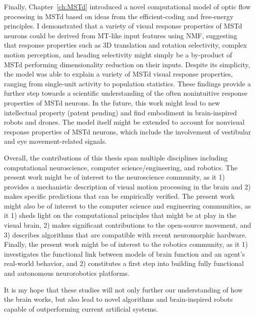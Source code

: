 Finally, Chapter~\ref{ch:MSTd} introduced a novel computational model
of optic flow processing in \ac{MSTd} based on ideas from the 
efficient-coding and free-energy principles. 
I demonstrated that a variety of visual response properties of \ac{MSTd}
neurons could be derived from \ac{MT}-like input features using \ac{NMF},
suggesting that response properties such as 3D translation and rotation
selectivity, complex motion perception, and heading selectivity might 
simply be a by-product of \ac{MSTd} performing dimensionality reduction 
on their inputs.
Despite its simplicity, the model was able to explain a variety of
\ac{MSTd} visual response properties, ranging from single-unit activity to
population statistics.
These findings provide a further step towards a scientific understanding
of the often nonintuitive response properties of \ac{MSTd} neurons.
In the future, this work might lead to new intellectual property (patent pending)
and find embodiment in brain-inspired robots and drones.
The model itself might be extended to account for nonvisual response
properties of \ac{MSTd} neurons, which include the involvement of
vestibular and eye movement-related signals.

Overall, the contributions of this thesis span multiple disciplines including
computational neuroscience, computer science/engineering, and robotics.
The present work might be of interest to the neuroscience community, as it
1) provides a mechanistic description of visual motion processing in the brain
and 2) makes specific predictions that can be empirically verified.
The present work might also be of interest to the computer science and
engineering communities, as it 
1) sheds light on the computational principles that might be at play 
in the visual brain, 
2) makes significant contributions to the open-source movement, and
3) describes algorithms that are compatible with recent neuromorphic hardware.
Finally, the present work might be of interest to the robotics community, as it
1) investigates the functional link between models of brain function and an
agent's real-world behavior,
and 2) constitutes a first step into building fully functional and autonomous
neurorobotics platforms.

It is my hope that these studies will not only further our understanding 
of how the brain works, but also lead to novel algorithms and 
brain-inspired robots capable of outperforming current artificial systems.


